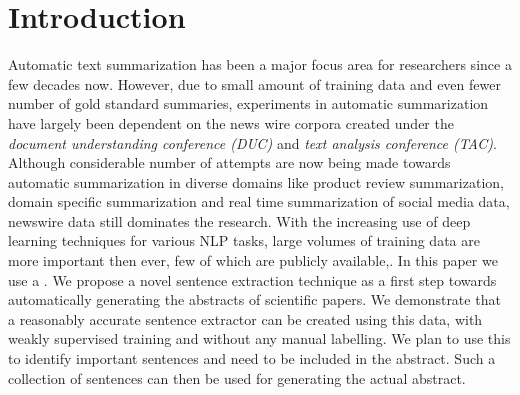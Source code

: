 \section{Introduction}

Automatic text summarization has been a major focus area for researchers since a few decades now. However, due to small amount of training data and even fewer number of gold standard summaries, experiments in automatic summarization have largely been dependent on the news wire corpora created under the \emph{document understanding conference (DUC)} and \emph{text analysis conference (TAC)}. Although considerable number of attempts are now being made towards automatic summarization in diverse domains like product review summarization, domain specific summarization and real time summarization of social media data, newswire data still dominates the research. With the increasing use of deep learning techniques for various NLP tasks, large volumes of training data are more important then ever, few of which are publicly available\cite{rush2015neural},\cite{filippova2015sentence}. In this paper we use a . We propose a novel sentence extraction technique as a first step towards automatically generating the abstracts of scientific papers. We demonstrate that a reasonably accurate sentence extractor can be created using this data, with weakly supervised training and without any manual labelling. We plan to use this to identify important sentences and need to be included in the abstract. Such a collection of sentences can then be used for generating the actual abstract. 

